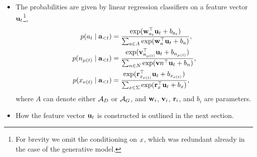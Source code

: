 \begin{itemize}
  \item The probabilities are given by linear regression classifiers on a feature vector $\mathbf{u}_t$\footnote{For brevity we omit the conditioning on $x$, which was redundant already in the case of the generative model.},
  \begin{align}
    \label{eq:action-regression}
    p(a_t \mid \mathbf{a}_{<t})
      &= \frac{ \exp ( \mathbf{w}_{a_t}^{\top} \mathbf{u}_t + b_{a_t} ) }{ \sum_{a \in A} \exp ( \mathbf{w}_{a}^{\top} \mathbf{u}_t + b_{a} ) },  \\
    p(n_{\mu(t)} \mid \mathbf{a}_{<t})
      &= \frac{ \exp ( \mathbf{v}_{n_{\mu(t)}}^{\top} \mathbf{u}_t + b_{n_{\mu(t)}} ) }{ \sum_{n \in N} \exp ( \mathbf{v} {n}^{\top} \mathbf{u}_t + b_{n} ) }, \\
    p(x_{\nu(t)} \mid \mathbf{a}_{<t})
      &= \frac{ \exp ( \mathbf{r}_{x_{\nu(t)}}^{\top} \mathbf{u}_t + b_{x_{\nu(t)}} ) }{ \sum_{x \in \Sigma} \exp ( \mathbf{r}_{x}^{\top} \mathbf{u}_t + b_{x} ) },  \\
  \end{align}
  where $A$ can denote either $\mathcal{A}_D$ or $\mathcal{A}_G$, and $\mathbf{w}_i$, $\mathbf{v}_i$, $\mathbf{r}_i$, and $b_i$ are parameters.

  \item How the feature vector $\mathbf{u}_t$ is constructed is outlined in the next section.


\end{itemize}
